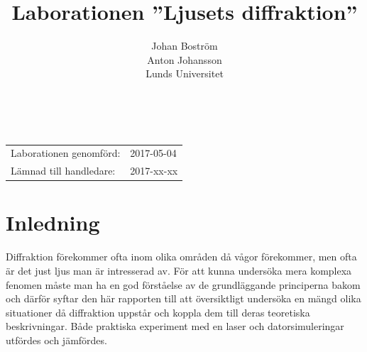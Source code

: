 \documentclass[a4paper]{article}
\title{Laborationen ”Ljusets diffraktion”}
\author{Johan Boström\\Anton Johansson\\Lunds Universitet}
\makeatletter
\renewcommand*\maketitle{
  {
    \begin{center}
      {\huge\bfseries \@title}\\
      \vspace{5mm}
      {\large \@author}
    \end{center}
    \vspace{2mm}
  }
}
\makeatother
\begin{document}
\maketitle

\renewcommand{\abstractname}{Abstract} %

  

\vspace{2mm}

\hspace{-3mm}
\begin{tabular}{ll}
Laborationen genomförd: &	2017-05-04 \\
Lämnad till handledare: &	2017-xx-xx \\
\end{tabular}

\vspace{3mm}

\section{Inledning}

%

Diffraktion förekommer ofta inom olika områden då vågor förekommer, men ofta är det just ljus man är intresserad av. För att kunna undersöka mera komplexa fenomen måste man ha en god förståelse av de grundläggande principerna bakom och därför syftar den här rapporten till att översiktligt undersöka en mängd olika situationer då diffraktion uppstår och koppla dem till deras teoretiska beskrivningar. Både praktiska experiment med en laser och datorsimuleringar utfördes och jämfördes.
\end{document}
